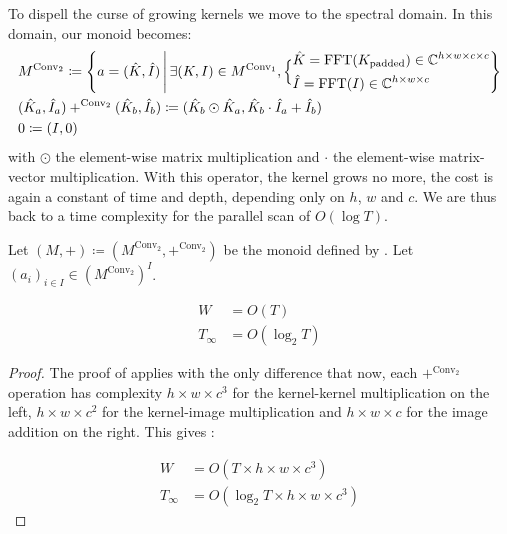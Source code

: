 To dispell the curse of growing kernels we move to the spectral domain. In this domain, our monoid becomes:
\begin{align}
\label{eq:M_SSM_spectral}
    &M^{\mathrm{Conv}_2}\coloneqq \left\{ a = (\hat{K}, \hat{I})\,\middle|\,\exists (K, I)\in M^{\mathrm{Conv}_1},\Bigl\{
\begin{aligned}
    &\hat{K} = \mathrm{FFT}(K_{\mathrm{padded}})\in \mathbb{C}^{h\times w\times c\times c}\\
    &\hat{I} = \mathrm{FFT}(I)\in \mathbb{C}^{h\times w\times c}
\end{aligned}
\Bigr.\right\}\\
\label{eq:+_SSM_spectral}
    &(\hat{K}_a, \hat{I}_a) +^{\mathrm{Conv}_2} (\hat{K}_b,\hat{I}_b)\coloneqq (\hat{K}_b \odot \hat{K}_a, \hat{K}_b \cdot \hat{I}_a + \hat{I}_b)\\
\label{eq:0_SSM_spectral}
    &0\coloneqq(I, 0)
\end{align}
\noindent with $\odot$ the element-wise matrix multiplication and $\cdot$ the element-wise matrix-vector multiplication. With this operator, the kernel grows no more, the cost is again a constant of time and depth, depending only on $h$, $w$ and $c$. We are thus back to a time complexity for the parallel scan of $O(\log T)$.

\begin{proposition}
\label{prop:spectral_conv_complexity}
    Let $(M, +) \coloneqq (M^{\mathrm{Conv}_2}, +^{\mathrm{Conv}_2})$ be the monoid defined by . Let $(a_i)_{i\in I}\in (M^{\mathrm{Conv}_2})^I$.

\begin{align}
    W&= O(T)\\
    T_\infty&= O(\log_2T)
\end{align}
\end{proposition}

\begin{proof}
The proof of  applies with the only difference that now, each $+^{\mathrm{Conv}_2}$ operation has complexity $h \times w \times c^3$ for the kernel-kernel multiplication on the left, $h \times w \times c^2$ for the kernel-image multiplication and $h \times w \times c$ for the image addition on the right. This gives :

\begin{align}
\label{eq:W_spectral}
    W&= O(T \times h \times w \times c^3)\\
\label{eq:T_spectral}
    T_\infty&= O(\log_2T \times h \times w \times c^3)
\end{align}
\end{proof}

